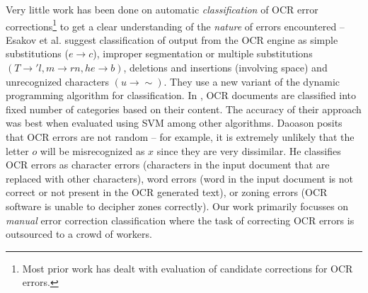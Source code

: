 \documentclass[letterpaper]{article}
\begin{document}
Very little work has been done on automatic \emph{classification} of OCR error corrections\footnote{Most prior work has dealt with evaluation of candidate corrections for OCR errors.} to get a clear understanding of the \emph{nature} of errors encountered -- Esakov et al. \cite{Esakov_94a} suggest classification of output from the OCR engine as simple substitutions ($e \rightarrow c$), improper segmentation or multiple substitutions $(T \rightarrow 'l, m \rightarrow rn, he \rightarrow b)$, deletions and insertions (involving space) and unrecognized characters $(u \rightarrow \sim)$. They use a new variant of the dynamic programming algorithm for classification. In \cite{hybred}, OCR documents are classified into fixed number of categories based on their content. The accuracy of their approach was best when evaluated using SVM among other algorithms. Daoason \cite{Jon_12} posits that OCR errors are not random -- for example, it is extremely unlikely that the letter $o$ will be misrecognized as $x$ since they are very dissimilar. He classifies OCR errors as character errors (characters in the input document that are replaced with other characters), word errors (word in the input document is not correct or not present in the OCR generated text), or zoning errors (OCR software is unable to decipher zones correctly). Our work primarily focusses on \emph{manual} error correction classification where the task of correcting OCR errors is outsourced to a crowd of workers. 

\end{document}
